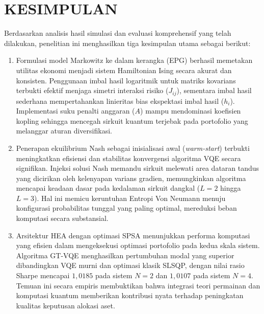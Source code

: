 \section{KESIMPULAN}

Berdasarkan analisis hasil simulasi dan evaluasi komprehensif yang telah dilakukan, penelitian ini menghasilkan tiga kesimpulan utama sebagai berikut:
\begin{enumerate}
    \item Formulasi model Markowitz ke dalam kerangka (EPG) berhasil memetakan utilitas ekonomi menjadi sistem Hamiltonian Ising secara akurat dan konsisten. Penggunaan imbal hasil logaritmik untuk matriks kovarians terbukti efektif menjaga simetri interaksi risiko ($J_{ij}$), sementara imbal hasil sederhana mempertahankan linieritas bias ekspektasi imbal hasil ($h_i$). Implementasi suku penalti anggaran ($A$) mampu mendominasi koefisien kopling sehingga mencegah sirkuit kuantum terjebak pada portofolio yang melanggar aturan diversifikasi.
    \item Penerapan ekuilibrium Nash sebagai inisialisasi awal (\textit{warm-start}) terbukti meningkatkan efisiensi dan stabilitas konvergensi algoritma VQE secara signifikan. Injeksi solusi Nash memandu sirkuit melewati area dataran tandus yang dicirikan oleh kelenyapan varians gradien, memungkinkan algoritma mencapai keadaan dasar pada kedalaman sirkuit dangkal ($L=2$ hingga $L=3$). Hal ini memicu keruntuhan Entropi Von Neumann menuju konfigurasi probabilitas tunggal yang paling optimal, mereduksi beban komputasi secara substansial.
    \item Arsitektur HEA dengan optimasi SPSA menunjukkan performa komputasi yang efisien dalam mengeksekusi optimasi portofolio pada kedua skala sistem. Algoritma GT-VQE menghasilkan pertumbuhan modal yang superior dibandingkan VQE murni dan optimasi klasik SLSQP, dengan nilai rasio Sharpe mencapai $1{,}0185$ pada sistem $N=2$ dan $1{,}0107$ pada sistem $N=4$. Temuan ini secara empiris membuktikan bahwa integrasi teori permainan dan komputasi kuantum memberikan kontribusi nyata terhadap peningkatan kualitas keputusan alokasi aset.
\end{enumerate}

